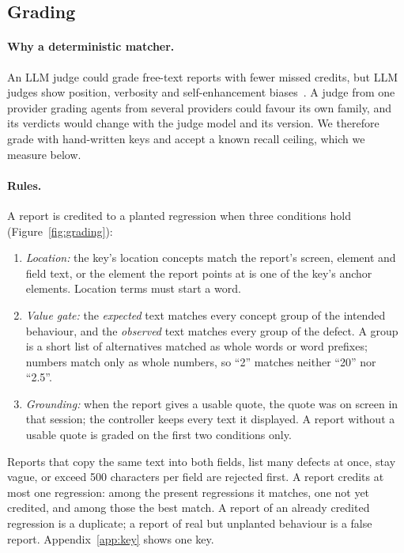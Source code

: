 \documentclass[sigconf]{acmart}
\begin{document}
\subsection{Grading}
\label{sec:grading}

\paragraph{Why a deterministic matcher.}
An LLM judge could grade free-text reports with fewer missed credits, but LLM judges show position,
verbosity and self-enhancement biases~\cite{zheng2023judge}. A judge from one provider grading agents
from several providers could favour its own family, and its verdicts would change with the judge
model and its version. We therefore grade with hand-written keys and accept a known recall ceiling,
which we measure below.

\paragraph{Rules.}
A report is credited to a planted regression when three conditions hold (Figure~\ref{fig:grading}):
\begin{enumerate}[leftmargin=*]
\item \emph{Location:} the key's location concepts match the report's screen, element and field text,
  or the element the report points at is one of the key's anchor elements. Location terms must start
  a word.
\item \emph{Value gate:} the \emph{expected} text matches every concept group of the intended
  behaviour, and the \emph{observed} text matches every group of the defect. A group is a short list
  of alternatives matched as whole words or word prefixes; numbers match only as whole numbers, so
  ``2'' matches neither ``20'' nor ``2.5''.
\item \emph{Grounding:} when the report gives a usable quote, the quote was on screen in that session;
  the controller keeps every text it displayed. A report without a usable quote is graded on the
  first two conditions only.
\end{enumerate}
Reports that copy the same text into both fields, list many defects at once, stay vague, or exceed
500 characters per field are rejected first. A report credits at most one regression: among the
present regressions it matches, one not yet credited, and among those the best match. A report of an
already credited regression is a duplicate; a report of real but unplanted behaviour is a false
report. Appendix~\ref{app:key} shows one key.
\end{document}
